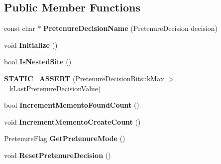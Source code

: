 \subsection*{Public Member Functions}
\begin{DoxyCompactItemize}
\item 
\hypertarget{classv8_1_1internal_1_1_allocation_site_a015895d2a527877f98749eb13b16a38f}{}const char $\ast$ {\bfseries Pretenure\+Decision\+Name} (Pretenure\+Decision decision)\label{classv8_1_1internal_1_1_allocation_site_a015895d2a527877f98749eb13b16a38f}

\item 
\hypertarget{classv8_1_1internal_1_1_allocation_site_a81f61008e147366d1eea6cdbae9d5ded}{}void {\bfseries Initialize} ()\label{classv8_1_1internal_1_1_allocation_site_a81f61008e147366d1eea6cdbae9d5ded}

\item 
\hypertarget{classv8_1_1internal_1_1_allocation_site_ab9a3fce3780154b3da48ae09cb0b8d46}{}bool {\bfseries Is\+Nested\+Site} ()\label{classv8_1_1internal_1_1_allocation_site_ab9a3fce3780154b3da48ae09cb0b8d46}

\item 
\hypertarget{classv8_1_1internal_1_1_allocation_site_ad1c0e4e32b7e2db1483fa7a518bec030}{}{\bfseries S\+T\+A\+T\+I\+C\+\_\+\+A\+S\+S\+E\+R\+T} (Pretenure\+Decision\+Bits\+::k\+Max $>$=k\+Last\+Pretenure\+Decision\+Value)\label{classv8_1_1internal_1_1_allocation_site_ad1c0e4e32b7e2db1483fa7a518bec030}

\item 
\hypertarget{classv8_1_1internal_1_1_allocation_site_ac623c7ec4eb8500c272828a539d61632}{}bool {\bfseries Increment\+Memento\+Found\+Count} ()\label{classv8_1_1internal_1_1_allocation_site_ac623c7ec4eb8500c272828a539d61632}

\item 
\hypertarget{classv8_1_1internal_1_1_allocation_site_ac32fcfb926ce03239f5df6aca880f18c}{}void {\bfseries Increment\+Memento\+Create\+Count} ()\label{classv8_1_1internal_1_1_allocation_site_ac32fcfb926ce03239f5df6aca880f18c}

\item 
\hypertarget{classv8_1_1internal_1_1_allocation_site_a06aadcce1164186ecce0962c359abb0c}{}Pretenure\+Flag {\bfseries Get\+Pretenure\+Mode} ()\label{classv8_1_1internal_1_1_allocation_site_a06aadcce1164186ecce0962c359abb0c}

\item 
\hypertarget{classv8_1_1internal_1_1_allocation_site_aa1b323951edb619dd9078164b9fabd5c}{}void {\bfseries Reset\+Pretenure\+Decision} ()\label{classv8_1_1internal_1_1_allocation_site_aa1b323951edb619dd9078164b9fabd5c}


\end{DoxyCompactItemize}
